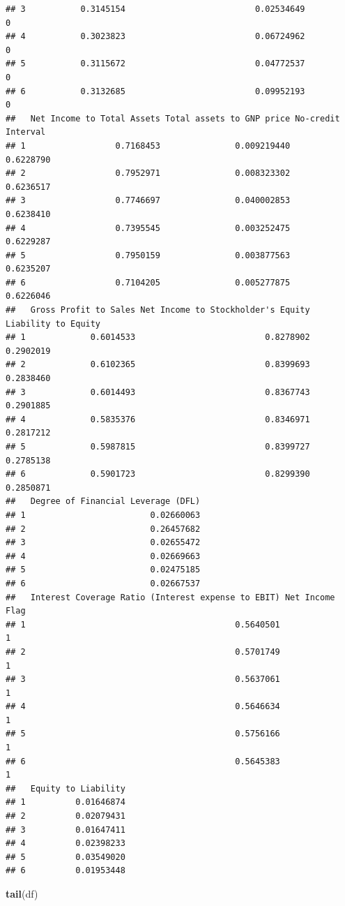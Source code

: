 \documentclass[
]{book}
\newenvironment{Shaded}{\begin{snugshade}}{\end{snugshade}}
\newcommand{\FunctionTok}[1]{\textcolor[rgb]{0.13,0.29,0.53}{\textbf{#1}}}
\newcommand{\NormalTok}[1]{#1}
\begin{document}
\begin{verbatim}
## 3           0.3145154                          0.02534649                     0
## 4           0.3023823                          0.06724962                     0
## 5           0.3115672                          0.04772537                     0
## 6           0.3132685                          0.09952193                     0
##   Net Income to Total Assets Total assets to GNP price No-credit Interval
## 1                  0.7168453               0.009219440          0.6228790
## 2                  0.7952971               0.008323302          0.6236517
## 3                  0.7746697               0.040002853          0.6238410
## 4                  0.7395545               0.003252475          0.6229287
## 5                  0.7950159               0.003877563          0.6235207
## 6                  0.7104205               0.005277875          0.6226046
##   Gross Profit to Sales Net Income to Stockholder's Equity Liability to Equity
## 1             0.6014533                          0.8278902           0.2902019
## 2             0.6102365                          0.8399693           0.2838460
## 3             0.6014493                          0.8367743           0.2901885
## 4             0.5835376                          0.8346971           0.2817212
## 5             0.5987815                          0.8399727           0.2785138
## 6             0.5901723                          0.8299390           0.2850871
##   Degree of Financial Leverage (DFL)
## 1                         0.02660063
## 2                         0.26457682
## 3                         0.02655472
## 4                         0.02669663
## 5                         0.02475185
## 6                         0.02667537
##   Interest Coverage Ratio (Interest expense to EBIT) Net Income Flag
## 1                                          0.5640501               1
## 2                                          0.5701749               1
## 3                                          0.5637061               1
## 4                                          0.5646634               1
## 5                                          0.5756166               1
## 6                                          0.5645383               1
##   Equity to Liability
## 1          0.01646874
## 2          0.02079431
## 3          0.01647411
## 4          0.02398233
## 5          0.03549020
## 6          0.01953448
\end{verbatim}

\begin{Shaded}
\begin{Highlighting}[]
\FunctionTok{tail}\NormalTok{(df)}
\end{Highlighting}
\end{Shaded}
\end{document}
